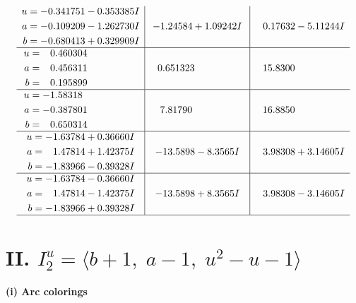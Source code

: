 \documentclass[1p]{elsarticle_modified}
\theoremstyle{definition}
\begin{document}
$$\begin{array}{c|c|c}
\begin{aligned}
u &= -0.341751 - 0.353385 I \\
a &= -0.109209 - 1.262730 I \\
b &= -0.680413 + 0.329909 I\end{aligned}
 & -1.24584 + 1.09242 I & \phantom{-}0.17632 - 5.11244 I \\ \hline\begin{aligned}
u &= \phantom{-}0.460304\phantom{ +0.000000I} \\
a &= \phantom{-}0.456311\phantom{ +0.000000I} \\
b &= \phantom{-}0.195899\phantom{ +0.000000I}\end{aligned}
 & \phantom{-}0.651323\phantom{ +0.000000I} & \phantom{-}15.8300\phantom{ +0.000000I} \\ \hline\begin{aligned}
u &= -1.58318\phantom{ +0.000000I} \\
a &= -0.387801\phantom{ +0.000000I} \\
b &= \phantom{-}0.650314\phantom{ +0.000000I}\end{aligned}
 & \phantom{-}7.81790\phantom{ +0.000000I} & \phantom{-}16.8850\phantom{ +0.000000I} \\ \hline\begin{aligned}
u &= -1.63784 + 0.36660 I \\
a &= \phantom{-}1.47814 + 1.42375 I \\
b &= -1.83966 - 0.39328 I\end{aligned}
 & -13.5898 - 8.3565 I & \phantom{-}3.98308 + 3.14605 I \\ \hline\begin{aligned}
u &= -1.63784 - 0.36660 I \\
a &= \phantom{-}1.47814 - 1.42375 I \\
b &= -1.83966 + 0.39328 I\end{aligned}
 & -13.5898 + 8.3565 I & \phantom{-}3.98308 - 3.14605 I\\
 \hline 
 \end{array}$$\newpage\newpage\renewcommand{\arraystretch}{1}
\centering \section*{II. $I^u_{2}= \langle b+1,\;a-1,\;u^2- u-1 \rangle$}
\flushleft \textbf{(i) Arc colorings}\\
\end{document}
